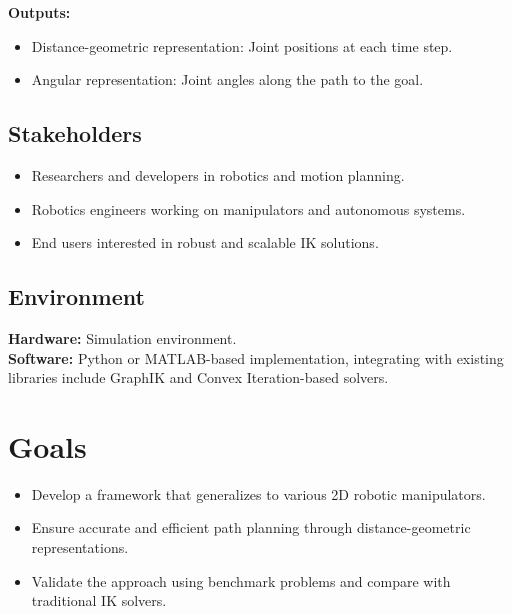 \documentclass{article}
\begin{document}
\textbf{Outputs:}
\begin{itemize}
    \item Distance-geometric representation: Joint positions at each time step.
    \item Angular representation: Joint angles along the path to the goal.
\end{itemize}

\subsection{Stakeholders}
\begin{itemize}
    \item Researchers and developers in robotics and motion planning.
    \item Robotics engineers working on manipulators and autonomous systems.
    \item End users interested in robust and scalable IK solutions.
\end{itemize}

\subsection{Environment}
\textbf{Hardware:} Simulation environment.\\
\textbf{Software:} Python or MATLAB-based implementation, integrating with existing libraries include GraphIK and Convex Iteration-based solvers.

\section{Goals}
\begin{itemize}
    \item Develop a framework that generalizes to various 2D robotic manipulators.
    \item Ensure accurate and efficient path planning through distance-geometric representations.
    \item Validate the approach using benchmark problems and compare with traditional IK solvers.
\end{itemize}
\end{document}
